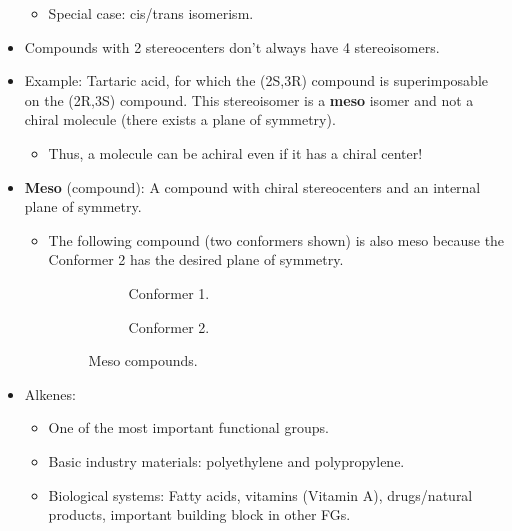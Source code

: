 \documentclass[../notes.tex]{subfiles}
\begin{document}
\begin{itemize}
    \begin{itemize}
        \item Special case: cis/trans isomerism.
    \end{itemize}
    \item Compounds with 2 stereocenters don't always have 4 stereoisomers.
    \item Example: Tartaric acid, for which the (2S,3R) compound is superimposable on the (2R,3S) compound. This stereoisomer is a \textbf{meso} isomer and not a chiral molecule (there exists a plane of symmetry).
    \begin{itemize}
        \item Thus, a molecule can be achiral even if it has a chiral center!
    \end{itemize}
    \item \textbf{Meso} (compound): A compound with chiral stereocenters and an internal plane of symmetry.
    \begin{itemize}
        \item The following compound (two conformers shown) is also meso because the Conformer 2 has the desired plane of symmetry.
        \begin{figure}[h!]
            \centering
            \footnotesize
            \begin{subfigure}[b]{0.25\linewidth}
                \centering
                \caption{Conformer 1.}
                \label{fig:mesoCompounda}
            \end{subfigure}
            \begin{subfigure}[b]{0.25\linewidth}
                \centering
                \caption{Conformer 2.}
                \label{fig:mesoCompoundb}
            \end{subfigure}
            \caption{Meso compounds.}
            \label{fig:mesoCompound}
        \end{figure}
    \end{itemize}
    \item Alkenes:
    \begin{itemize}
        \item One of the most important functional groups.
        \item Basic industry materials: polyethylene and polypropylene.
        \item Biological systems: Fatty acids, vitamins (Vitamin A), drugs/natural products, important building block in other FGs.

\end{itemize}
\end{itemize}
\end{document}
